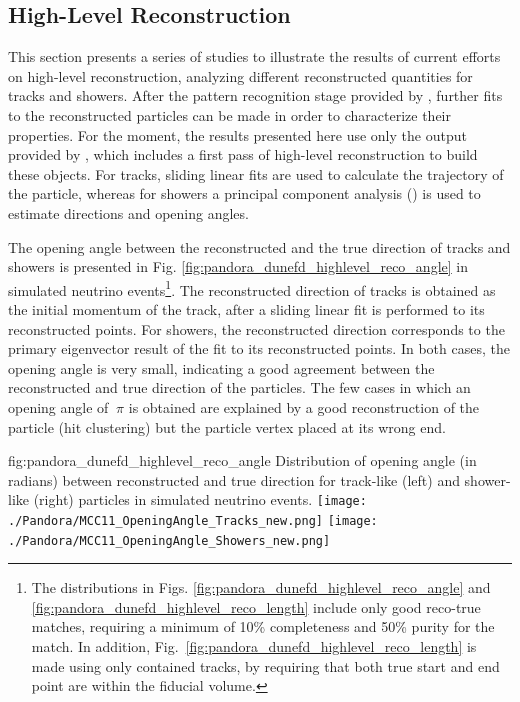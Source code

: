 \subsection{High-Level Reconstruction}
\label{sec:Pandora:High}

This section presents a series of studies to illustrate the results of current efforts on high-level reconstruction, analyzing different reconstructed quantities for tracks and showers. After the pattern recognition stage provided by , further fits to the reconstructed \threed particles can be made in order to characterize their properties. For the moment, the results presented here use only the output provided by , which includes a first pass of high-level reconstruction to build these objects. For tracks,  sliding linear fits are used to calculate the trajectory of the particle, whereas for showers a principal component analysis () is used to estimate directions and opening angles. 

The opening angle between the reconstructed and the true \threed direction of tracks and showers is presented in Fig. \ref{fig:pandora_dunefd_highlevel_reco_angle} in simulated  neutrino events\footnote{The distributions in Figs. \ref{fig:pandora_dunefd_highlevel_reco_angle} and \ref{fig:pandora_dunefd_highlevel_reco_length} include only good reco-true matches, requiring a minimum of 10\% completeness and 50\% purity for the match. In addition, Fig.~\ref{fig:pandora_dunefd_highlevel_reco_length} is made using only contained tracks, by requiring that both true start and end point are within the fiducial volume. }. The reconstructed direction of tracks is obtained as the initial momentum of the track, after a  sliding linear fit is performed to its reconstructed \threed points. For showers, the reconstructed direction corresponds to the primary eigenvector result of the  fit to its reconstructed \threed points. In both cases, the opening angle is very small, indicating a good agreement between the reconstructed and true direction of the particles. The few cases in which an opening angle of $~\pi$ is obtained are explained by a good reconstruction of the particle (hit clustering) but the particle vertex placed at its wrong end. 

\begin{dunefigure}
{fig:pandora_dunefd_highlevel_reco_angle}
{Distribution of opening angle (in radians) between reconstructed and true direction for track-like (left) and shower-like (right) particles in simulated  neutrino events.}
\texttt{[image: ./Pandora/MCC11\_OpeningAngle\_Tracks\_new.png]}
\texttt{[image: ./Pandora/MCC11\_OpeningAngle\_Showers\_new.png]}
\end{dunefigure}


